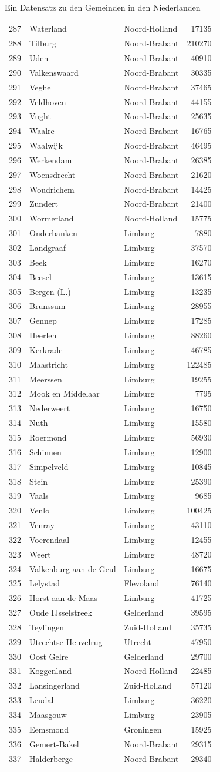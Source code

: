 \documentclass[ignorenonframetext,]{beamer}
\begin{document}
\begin{frame}[fragile]{Ein Datensatz zu den Gemeinden in den
Niederlanden}
\begin{longtable}[]{@{}lllr@{}}
287 & Waterland & Noord-Holland & 17135\tabularnewline
288 & Tilburg & Noord-Brabant & 210270\tabularnewline
289 & Uden & Noord-Brabant & 40910\tabularnewline
290 & Valkenswaard & Noord-Brabant & 30335\tabularnewline
291 & Veghel & Noord-Brabant & 37465\tabularnewline
292 & Veldhoven & Noord-Brabant & 44155\tabularnewline
293 & Vught & Noord-Brabant & 25635\tabularnewline
294 & Waalre & Noord-Brabant & 16765\tabularnewline
295 & Waalwijk & Noord-Brabant & 46495\tabularnewline
296 & Werkendam & Noord-Brabant & 26385\tabularnewline
297 & Woensdrecht & Noord-Brabant & 21620\tabularnewline
298 & Woudrichem & Noord-Brabant & 14425\tabularnewline
299 & Zundert & Noord-Brabant & 21400\tabularnewline
300 & Wormerland & Noord-Holland & 15775\tabularnewline
301 & Onderbanken & Limburg & 7880\tabularnewline
302 & Landgraaf & Limburg & 37570\tabularnewline
303 & Beek & Limburg & 16270\tabularnewline
304 & Beesel & Limburg & 13615\tabularnewline
305 & Bergen (L.) & Limburg & 13235\tabularnewline
306 & Brunssum & Limburg & 28955\tabularnewline
307 & Gennep & Limburg & 17285\tabularnewline
308 & Heerlen & Limburg & 88260\tabularnewline
309 & Kerkrade & Limburg & 46785\tabularnewline
310 & Maastricht & Limburg & 122485\tabularnewline
311 & Meerssen & Limburg & 19255\tabularnewline
312 & Mook en Middelaar & Limburg & 7795\tabularnewline
313 & Nederweert & Limburg & 16750\tabularnewline
314 & Nuth & Limburg & 15580\tabularnewline
315 & Roermond & Limburg & 56930\tabularnewline
316 & Schinnen & Limburg & 12900\tabularnewline
317 & Simpelveld & Limburg & 10845\tabularnewline
318 & Stein & Limburg & 25390\tabularnewline
319 & Vaals & Limburg & 9685\tabularnewline
320 & Venlo & Limburg & 100425\tabularnewline
321 & Venray & Limburg & 43110\tabularnewline
322 & Voerendaal & Limburg & 12455\tabularnewline
323 & Weert & Limburg & 48720\tabularnewline
324 & Valkenburg aan de Geul & Limburg & 16675\tabularnewline
325 & Lelystad & Flevoland & 76140\tabularnewline
326 & Horst aan de Maas & Limburg & 41725\tabularnewline
327 & Oude IJsselstreek & Gelderland & 39595\tabularnewline
328 & Teylingen & Zuid-Holland & 35735\tabularnewline
329 & Utrechtse Heuvelrug & Utrecht & 47950\tabularnewline
330 & Oost Gelre & Gelderland & 29700\tabularnewline
331 & Koggenland & Noord-Holland & 22485\tabularnewline
332 & Lansingerland & Zuid-Holland & 57120\tabularnewline
333 & Leudal & Limburg & 36220\tabularnewline
334 & Maasgouw & Limburg & 23905\tabularnewline
335 & Eemsmond & Groningen & 15925\tabularnewline
336 & Gemert-Bakel & Noord-Brabant & 29315\tabularnewline
337 & Halderberge & Noord-Brabant & 29340\tabularnewline

\end{longtable}
\end{frame}
\end{document}
